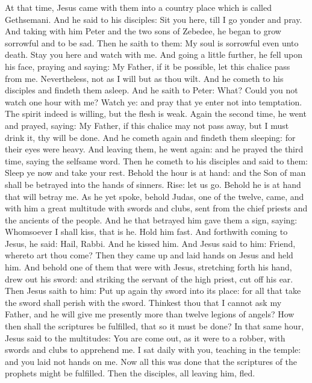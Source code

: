 \begin{multicols}{2}
At that time, Jesus came with them into a country place which is called Gethsemani. And
he said to his disciples: Sit you here, till I go yonder and pray.  And taking
with him Peter and the two sons of Zebedee, he began to grow sorrowful and to
be sad.  Then he saith to them: My soul is sorrowful even unto death. Stay you
here and watch with me.  And going a little further, he fell upon his face,
praying and saying: My Father, if it be possible, let this chalice pass from
me.  Nevertheless, not as I will but as thou wilt.  And he cometh to his
disciples and findeth them asleep. And he saith to Peter: What? Could you not
watch one hour with me?  Watch ye: and pray that ye enter not into temptation.
The spirit indeed is willing, but the flesh is weak.  Again the second time, he
went and prayed, saying: My Father, if this chalice may not pass away, but I
must drink it, thy will be done.  And he cometh again and findeth them
sleeping: for their eyes were heavy.  And leaving them, he went again: and he
prayed the third time, saying the selfsame word.  Then he cometh to his
disciples and said to them: Sleep ye now and take your rest. Behold the hour is
at hand: and the Son of man shall be betrayed into the hands of sinners.  Rise:
let us go. Behold he is at hand that will betray me.  As he yet spoke, behold
Judas, one of the twelve, came, and with him a great multitude with swords and
clubs, sent from the chief priests and the ancients of the people.  And he that
betrayed him gave them a sign, saying: Whomsoever I shall kiss, that is he.
Hold him fast.  And forthwith coming to Jesus, he said: Hail, Rabbi. And he
kissed him.  And Jesus said to him: Friend, whereto art thou come? Then they
came up and laid hands on Jesus and held him.  And behold one of them that were
with Jesus, stretching forth his hand, drew out his sword: and striking the
servant of the high priest, cut off his ear.  Then Jesus saith to him: Put up
again thy sword into its place: for all that take the sword shall perish with
the sword.  Thinkest thou that I cannot ask my Father, and he will give me
presently more than twelve legions of angels?  How then shall the scriptures be
fulfilled, that so it must be done?  In that same hour, Jesus said to the
multitudes: You are come out, as it were to a robber, with swords and clubs to
apprehend me. I sat daily with you, teaching in the temple: and you laid not
hands on me.  Now all this was done that the scriptures of the prophets might
be fulfilled. Then the disciples, all leaving him, fled.  


\end{multicols}
